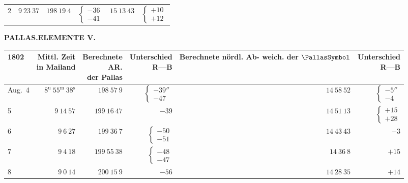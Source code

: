 \begin{center}
\begin{tabular}{l|r|r|r|r|r}
2&$9\ 23\ 37$&$198\ 19\ 4$&$\left\{\begin{array}{r}-36\\-41\end{array}\right.$&$15\ 13\ 43$&$\left\{\begin{array}{r}+10\\+12\end{array}\right.$
\end{tabular}\endgroup
\end{center}
\par\clearpage
\thispagestyle{empty}
\noindent{}%
\makebox[12mm][l]{}%
\parbox[t]{\dimexpr\linewidth-24mm\relax}{\centering\footnotesize\bfseries PALLAS.\enspace ELEMENTE V.\par}%
\par\nobreak\medskip
\begin{center}
\begingroup\footnotesize\setlength{\tabcolsep}{2pt}
\begin{tabular}{l|r|r|r|r|r}
1802&\shortstack{Mittl. Zeit\\in Mailand}&\shortstack{Berechnete\\AR.\\der Pallas}&\shortstack{Unterschied\\R—B}&\shortstack{Berechnete\\nördl. Ab-\\weich. der $\PallasSymbol$}&\shortstack{Unterschied\\R—B}\\\hline
Aug.\ 4&$8^{\mathrm u}\ 55^{\mathrm m}\ 38^{\mathrm s}$&$198\ 57\ 9$&$\left\{\begin{array}{r}-39''\\-47\end{array}\right.$&$14\ 58\ 52$&$\left\{\begin{array}{r}-5''\\-4\end{array}\right.$\\
5&$9\ 14\ 57$&$199\ 16\ 47$&$-39$&$14\ 51\ 13$&$\left\{\begin{array}{r}+15\\+28\end{array}\right.$\\
6&$9\ 6\ 27$&$199\ 36\ 7$&$\left\{\begin{array}{r}-50\\-51\end{array}\right.$&$14\ 43\ 43$&$-3$\\
7&$9\ 4\ 18$&$199\ 55\ 38$&$\left\{\begin{array}{r}-48\\-47\end{array}\right.$&$14\ 36\ 8$&$+15$\\
8&$9\ 0\ 14$&$200\ 15\ 9$&$-56$&$14\ 28\ 35$&$+14$
\end{tabular}\endgroup
\end{center}

